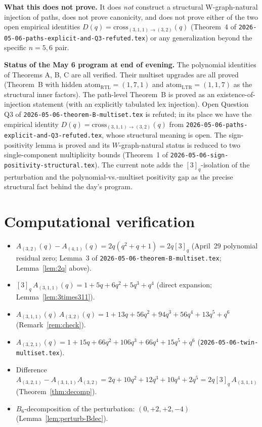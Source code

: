 \documentclass[11pt]{article}
\theoremstyle{definition}
\begin{document}
\textbf{What this does not prove.} It does \emph{not} construct a structural
W-graph-natural injection of paths, does not prove canonicity, and does not
prove either of the two open empirical identities $D(q) = \mathrm{cross}_{(3,1,1)\to(3,2)}(q)$
(Theorem~4 of \texttt{2026-05-06-paths-explicit-and-Q3-refuted.tex}) or any
generalization beyond the specific $n=5,6$ pair.

\textbf{Status of the May 6 program at end of evening.} The polynomial identities
of Theorems A, B, C are all verified. Their multiset upgrades are all proved
(Theorem~B with hidden $\mathrm{atom}_{\mathrm{RTL}} = (1, 7, 1)$ and
$\mathrm{atom}_{\mathrm{LTR}} = (1, 1, 7)$ as the structural inner factors). The
path-level Theorem~B is proved as an existence-of-injection statement (with an
explicitly tabulated lex injection). Open Question Q3 of
\texttt{2026-05-06-theorem-B-multiset.tex} is refuted; in its place we have the
empirical identity $D(q) = \mathrm{cross}_{(3,1,1)\to(3,2)}(q)$ from
\texttt{2026-05-06-paths-explicit-and-Q3-refuted.tex}, whose structural meaning
is open. The sign-positivity lemma is proved and its $W$-graph-natural status
is reduced to two single-component multiplicity bounds (Theorem~1 of
\texttt{2026-05-06-sign-positivity-structural.tex}). The current note adds the
$[3]_q$-isolation of the perturbation and the polynomial-vs.-multiset
positivity gap as the precise structural fact behind the day's program.

\section*{Computational verification}

\begin{itemize}[leftmargin=2em,topsep=0.2em,itemsep=0.1em]
\item $A_{(3,2)}(q) - A_{(4,1)}(q) = 2q(q^2+q+1) = 2q[3]_q$
  (April~29 polynomial residual zero;
  Lemma~3 of \texttt{2026-05-06-theorem-B-multiset.tex}; Lemma~\ref{lem:2q} above).
\item $[3]_q\, A_{(3,1,1)}(q) = 1 + 5q + 6q^2 + 5q^3 + q^4$
  (direct expansion; Lemma~\ref{lem:3times311}).
\item $A_{(3,1,1)}(q)\, A_{(3,2)}(q) = 1 + 13q + 56q^2 + 94q^3 + 56q^4 + 13q^5 + q^6$
  (Remark~\ref{rem:check}).
\item $A_{(3,2,1)}(q) = 1 + 15q + 66q^2 + 106q^3 + 66q^4 + 15q^5 + q^6$
  (\texttt{2026-05-06-twin-multiset.tex}).
\item Difference $A_{(3,2,1)} - A_{(3,1,1)} A_{(3,2)} = 2q + 10q^2 + 12q^3 + 10q^4 + 2q^5 = 2q[3]_q\, A_{(3,1,1)}$ (Theorem~\ref{thm:decomp}).
\item $B_6$-decomposition of the perturbation: $(0, +2, +2, -4)$ (Lemma~\ref{lem:perturb-Bdec}).
\end{itemize}
\end{document}
